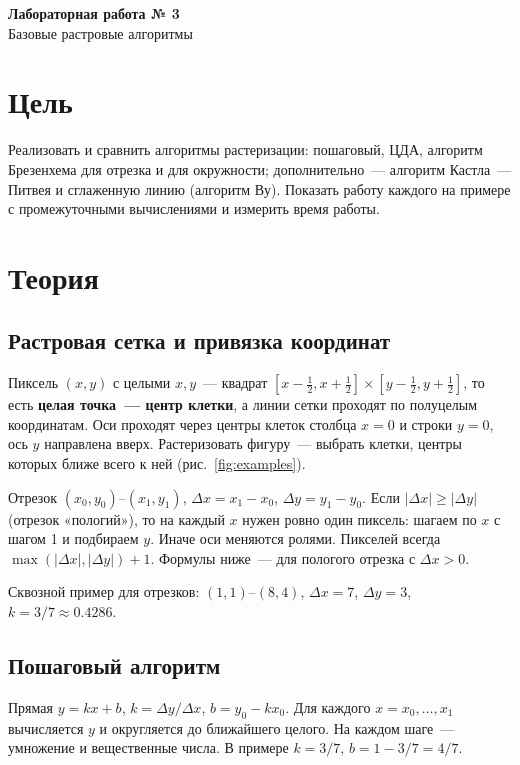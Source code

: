 \documentclass[11pt,a4paper]{article}
\begin{document}
\begin{center}
  {\LARGE\bfseries Лабораторная работа № 3}\\[0.4em]
  {\large Базовые растровые алгоритмы}
\end{center}

\section{Цель}
Реализовать и сравнить алгоритмы растеризации: пошаговый, ЦДА, алгоритм
Брезенхема для отрезка и для окружности; дополнительно~— алгоритм
Кастла~— Питвея и сглаженную линию (алгоритм Ву). Показать работу каждого на
примере с промежуточными вычислениями и измерить время работы.

\section{Теория}

\subsection{Растровая сетка и привязка координат}
Пиксель $(x, y)$ с целыми $x, y$~— квадрат $[x - \tfrac12, x + \tfrac12] \times [y - \tfrac12, y + \tfrac12]$,
то есть \textbf{целая точка~— центр клетки}, а линии сетки проходят по полуцелым
координатам. Оси проходят через центры клеток столбца $x = 0$ и строки $y = 0$, ось
$y$ направлена вверх. Растеризовать фигуру~— выбрать клетки, центры которых
ближе всего к ней (рис.~\ref{fig:examples}).

Отрезок $(x_0, y_0)$--$(x_1, y_1)$, $\Delta x = x_1 - x_0$, $\Delta y = y_1 - y_0$.
Если $|\Delta x| \ge |\Delta y|$ (отрезок «пологий»), то на каждый $x$ нужен ровно один
пиксель: шагаем по $x$ с шагом 1 и подбираем $y$. Иначе оси меняются ролями.
Пикселей всегда $\max(|\Delta x|, |\Delta y|) + 1$. Формулы ниже~— для
пологого отрезка с $\Delta x > 0$.

Сквозной пример для отрезков: $(1, 1)$--$(8, 4)$, $\Delta x = 7$, $\Delta y = 3$,
$k = 3/7 \approx 0.4286$.

\subsection{Пошаговый алгоритм}
Прямая $y = kx + b$, $k = \Delta y / \Delta x$, $b = y_0 - k x_0$. Для каждого
$x = x_0, \dots, x_1$ вычисляется $y$ и округляется до ближайшего целого. На каждом
шаге~— умножение и вещественные числа. В примере $k = 3/7$, $b = 1 - 3/7 = 4/7$.
\end{document}
